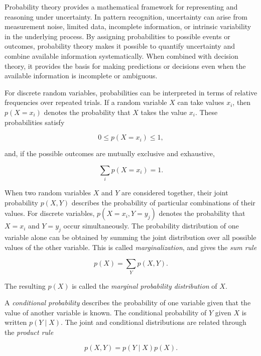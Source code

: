 \documentclass[10pt,twocolumn]{memoir}
\begin{document}
Probability theory provides a mathematical framework for representing and reasoning under uncertainty. In pattern recognition, uncertainty can arise from measurement noise, limited data, incomplete information, or intrinsic variability in the underlying process. By assigning probabilities to possible events or outcomes, probability theory makes it possible to quantify uncertainty and combine available information systematically. When combined with decision theory, it provides the basis for making predictions or decisions even when the available information is incomplete or ambiguous.

For discrete random variables, probabilities can be interpreted in terms of relative frequencies over repeated trials. If a random variable $X$ can take values $x_i$, then $p(X=x_i)$ denotes the probability that $X$ takes the value $x_i$. These probabilities satisfy

\begin{equation}
    0 \leq p(X=x_i) \leq 1,
\end{equation}

and, if the possible outcomes are mutually exclusive and exhaustive,

\begin{equation}
    \sum_i p(X=x_i) = 1.
\end{equation}

When two random variables $X$ and $Y$ are considered together, their joint probability $p(X,Y)$ describes the probability of particular combinations of their values. For discrete variables, $p(X=x_i,Y=y_j)$ denotes the probability that $X=x_i$ and $Y=y_j$ occur simultaneously. The probability distribution of one variable alone can be obtained by summing the joint distribution over all possible values of the other variable. This is called \textit{marginalization}, and gives the \textit{sum rule}

\begin{equation}
    p(X) = \sum_Y p(X,Y).
\end{equation}

The resulting $p(X)$ is called the \textit{marginal probability distribution} of $X$.

A \textit{conditional probability} describes the probability of one variable given that the value of another variable is known. The conditional probability of $Y$ given $X$ is written $p(Y \mid X)$. The joint and conditional distributions are related through the \textit{product rule}

\begin{equation}
    p(X,Y) = p(Y \mid X)p(X).
\label{eq:product_rule_1}
\end{equation}
\end{document}
